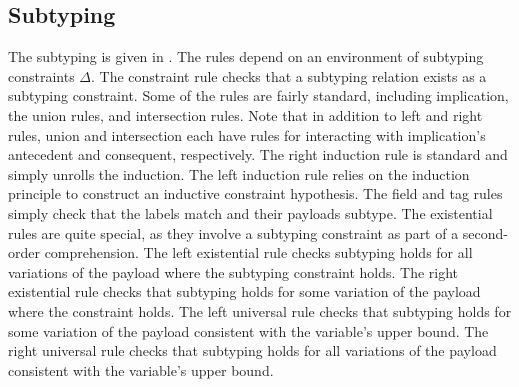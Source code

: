 \documentclass[acmsmall]{acmart}
\begin{document}
\subsection{Subtyping}
The subtyping is given in .
The rules depend on an environment of subtyping constraints $\Delta$.
The constraint rule checks that a subtyping relation exists as a subtyping constraint.
Some of the rules are fairly standard, including implication, the union rules, and intersection rules.
Note that in addition to left and right rules, union and intersection each have rules for 
interacting with implication's antecedent and consequent, respectively.
The right induction rule is standard and simply unrolls the induction.
The left induction rule relies on the induction principle to construct an 
inductive constraint hypothesis.  
The field and tag rules simply check that the labels match and their payloads subtype.
The existential rules are quite special, as they involve a subtyping constraint as part of 
a second-order comprehension. 
The left existential rule checks subtyping holds for all variations of the payload 
where the subtyping constraint holds. 
The right existential rule checks that subtyping holds for some variation of the payload where the constraint holds.
The left universal rule checks that subtyping holds for some variation of the payload consistent with
the variable's upper bound. 
The right universal rule checks that subtyping holds for all variations of the payload consistent with
the variable's upper bound.
\end{document}
